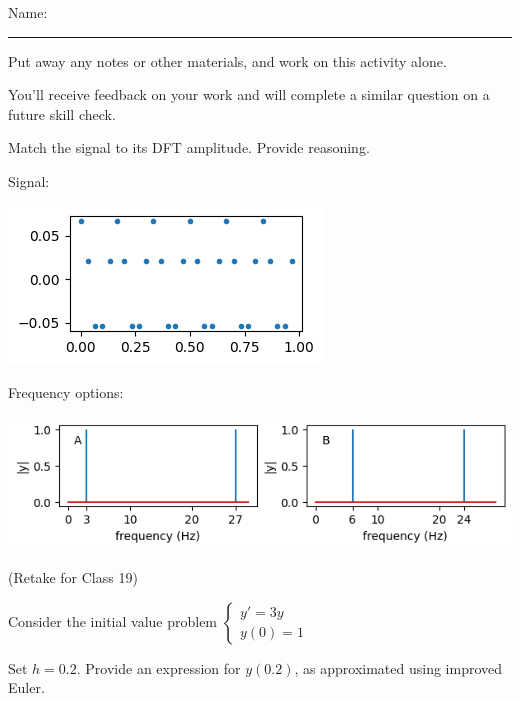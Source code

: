 \documentclass[12pt,letterpaper,noanswers]{exam}
\begin{document}
 \pdfpageheight 11in 
  \pdfpagewidth 8.5in

\noindent Name: \rule{2.5in}{0.5pt}

\noindent Put away any notes or other materials, and work on this activity alone.

\noindent You'll receive feedback on your work and will complete a similar question on a future skill check.


\begin{questions}
\item 
Match the signal to its DFT amplitude.  Provide reasoning.

Signal:

\includegraphics[width=0.3\linewidth]{img/C21skill-1.png}

Frequency options:

\includegraphics[width=0.7\linewidth]{img/C21skill2-1.png}

\vspace{3cm}

\item (Retake for Class 19)

Consider the initial value problem $\left\{\begin{array}{l}
y' = 3y \\
y(0) = 1
\end{array}
\right.$

Set $h = 0.2$.  Provide an expression for $y(0.2)$, as approximated using improved Euler.

\end{questions}
\end{document}
